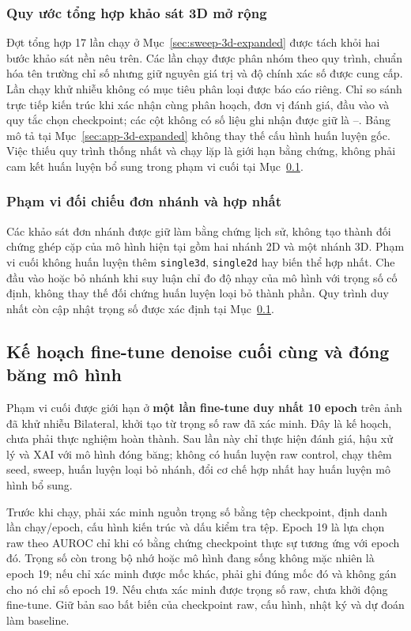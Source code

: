 \documentclass[14pt,a4paper,oneside]{extreport}
\begin{document}
\subsubsection{Quy ước tổng hợp khảo sát 3D mở rộng}
Đợt tổng hợp 17 lần chạy ở Mục~\ref{sec:sweep-3d-expanded} được tách khỏi
hai bước khảo sát nền nêu trên. Các lần chạy được phân nhóm theo quy trình,
chuẩn hóa tên trường chỉ số nhưng giữ nguyên giá trị và độ chính xác số
được cung cấp. Lần chạy khử nhiễu không có mục tiêu phân loại được báo cáo
riêng. Chỉ so sánh trực tiếp kiến trúc khi xác nhận cùng phân hoạch,
đơn vị đánh giá, đầu vào và quy tắc chọn checkpoint; các cột không có số liệu ghi nhận
được giữ là --. Bảng mô tả tại Mục~\ref{sec:app-3d-expanded}
không thay thế cấu hình huấn luyện gốc. Việc thiếu quy trình thống nhất và
chạy lặp là giới hạn bằng chứng, không phải cam kết huấn luyện bổ sung
trong phạm vi cuối tại Mục~\ref{sec:final-denoise-plan}.

\subsubsection{Phạm vi đối chiếu đơn nhánh và hợp nhất}
Các khảo sát đơn nhánh được giữ làm bằng chứng lịch sử, không tạo thành
đối chứng ghép cặp của mô hình hiện tại gồm hai nhánh 2D và một nhánh 3D.
Phạm vi cuối không huấn luyện thêm \texttt{single3d}, \texttt{single2d}
hay biến thể hợp nhất. Che đầu vào hoặc bỏ nhánh khi suy luận chỉ đo
độ nhạy của mô hình với trọng số cố định, không thay thế đối chứng
huấn luyện loại bỏ thành phần. Quy trình duy nhất còn cập nhật trọng số
được xác định tại Mục~\ref{sec:final-denoise-plan}.



\subsection{Kế hoạch fine-tune denoise cuối cùng và đóng băng mô hình}
\label{sec:final-denoise-plan}
Phạm vi cuối được giới hạn ở \textbf{một lần fine-tune duy nhất 10 epoch}
trên ảnh đã khử nhiễu Bilateral, khởi tạo từ trọng số raw đã xác minh.
Đây là kế hoạch, chưa phải thực nghiệm hoàn thành. Sau lần này chỉ
thực hiện đánh giá, hậu xử lý và XAI với mô hình đóng băng; không có
huấn luyện raw control, chạy thêm seed, sweep, huấn luyện loại bỏ nhánh,
đổi cơ chế hợp nhất hay huấn luyện mô hình bổ sung.

Trước khi chạy, phải xác minh nguồn trọng số bằng tệp checkpoint,
định danh lần chạy/epoch, cấu hình kiến trúc và dấu kiểm tra tệp.
Epoch 19 là lựa chọn raw theo AUROC chỉ khi có bằng chứng checkpoint
thực sự tương ứng với epoch đó. Trọng số còn trong bộ nhớ hoặc mô hình
đang sống không mặc nhiên là epoch 19; nếu chỉ xác minh được mốc khác,
phải ghi đúng mốc đó và không gán cho nó chỉ số epoch 19. Nếu chưa xác
minh được trọng số raw, chưa khởi động fine-tune. Giữ bản sao bất biến
của checkpoint raw, cấu hình, nhật ký và dự đoán làm baseline.
\end{document}
